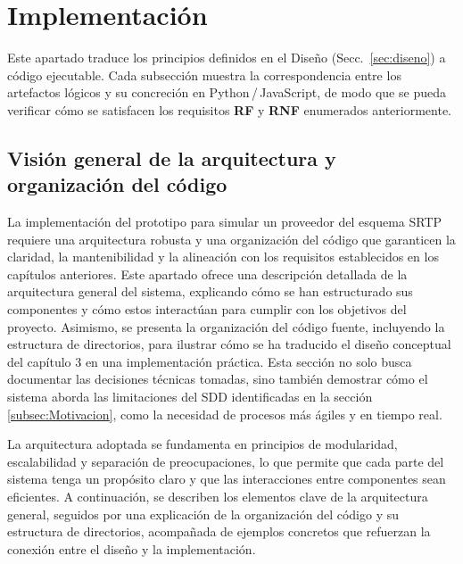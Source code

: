 \section{Implementación}
\label{sec:implementacion}

Este apartado traduce los principios definidos en el Diseño (Secc.~\ref{sec:diseno}) a código ejecutable. Cada subsección muestra la correspondencia entre los artefactos lógicos y su concreción en Python\,/\,JavaScript, de modo que se pueda verificar cómo se satisfacen los requisitos \textbf{RF} y \textbf{RNF} enumerados anteriormente.

\subsection{Visión general de la arquitectura y organización del código}
\label{sec:impl-vision}

\noindent
La implementación del prototipo para simular un proveedor del esquema SRTP requiere una arquitectura robusta y una organización del código que garanticen la claridad, la mantenibilidad y la alineación con los requisitos establecidos en los capítulos anteriores. Este apartado ofrece una descripción detallada de la arquitectura general del sistema, explicando cómo se han estructurado sus componentes y cómo estos interactúan para cumplir con los objetivos del proyecto. Asimismo, se presenta la organización del código fuente, incluyendo la estructura de directorios, para ilustrar cómo se ha traducido el diseño conceptual del capítulo 3 en una implementación práctica. Esta sección no solo busca documentar las decisiones técnicas tomadas, sino también demostrar cómo el sistema aborda las limitaciones del SDD identificadas en la sección \ref{subsec:Motivacion}, como la necesidad de procesos más ágiles y en tiempo real.

La arquitectura adoptada se fundamenta en principios de modularidad, escalabilidad y separación de preocupaciones, lo que permite que cada parte del sistema tenga un propósito claro y que las interacciones entre componentes sean eficientes. A continuación, se describen los elementos clave de la arquitectura general, seguidos por una explicación de la organización del código y su estructura de directorios, acompañada de ejemplos concretos que refuerzan la conexión entre el diseño y la implementación.

